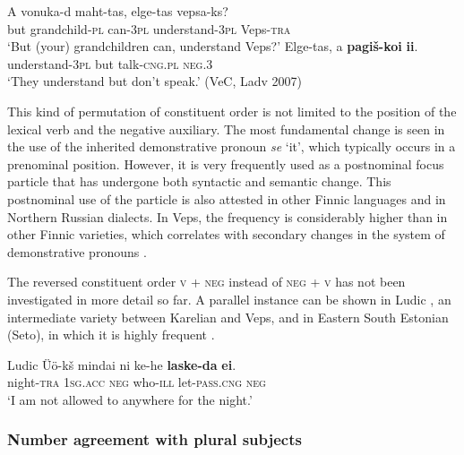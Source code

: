 \documentclass[output=paper,colorlinks=true, citecolor=brown]{langscibook}
\begin{document}
\ea\label{ex:vep:13}
    \begin{xlist}[Q: ]
    \label{ex:vep:13A}
        \gll  A vonuka-d maht{}-tas, elge{}-tas  vepsa-ks?\\ 
               but grandchild{}-\textsc{pl} can-3\textsc{pl} understand-3\textsc{pl} Veps-\textsc{tra}\\ 
        \glt ‘But (your) grandchildren can, understand Veps?'
    \label{ex:vep:13B}
        \gll  Elge{}-tas,  a \textbf{pagiš-koi} \textbf{ii}. \\ 
               understand{}-3\textsc{pl} but talk-\textsc{cng.pl} \textsc{neg.3}\\
        \glt ‘They understand but don’t speak.’  (VeC, Ladv 2007)
    \end{xlist}
\z

This kind of permutation of constituent order is not limited to the position of the lexical verb and the negative auxiliary. The most fundamental change is seen in the use of the inherited demonstrative pronoun \textit{se} ‘it’, which typically occurs in a prenominal position. However, it is very frequently used as a postnominal focus particle that has undergone both syntactic and semantic change. This postnominal use of the particle is also attested in other Finnic languages and in Northern Russian dialects. In Veps, the frequency is considerably higher than in other Finnic varieties, which correlates with secondary changes in the system of demonstrative pronouns \citep{Yurayong2020}.

The reversed constituent order \textsc{v} + \textsc{neg} instead of \textsc{neg} + \textsc{v} has not been investigated in more detail so far. A parallel instance can be shown in Ludic , an intermediate variety between Karelian and Veps, and in Eastern South Estonian (Seto), in which it is highly frequent \citep{LindströmEtAl2021}.

\ea\label{ex:vep:14} Ludic \newline %
    \gll Üö-kš  mindai ni ke-he \textbf{laske-da} \textbf{ei}. \\ 
        night{}-\textsc{tra} \textsc{1sg}.\textsc{acc} \textsc{neg} who-\textsc{ill} let-\textsc{pass.cng} \textsc{neg}\\
    \glt ‘I am not allowed to anywhere for the night.’ \citep[178]{MSFOu69}
\z 

\subsubsection{Number agreement with plural subjects}\label{sec:vep:2.1.3}
\end{document}
